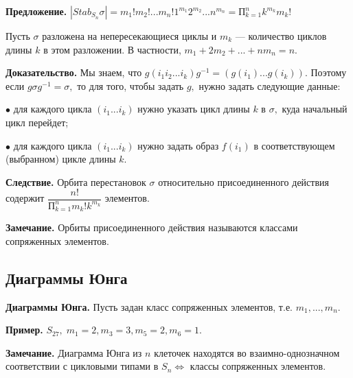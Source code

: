 \documentclass[12pt,a4paper]{article}
\begin{document}
\textbf{Предложение.} $|Stab_{S_{n}}\sigma| = m_{1}!m_{2}!...m_{n}!1^{m_{1}}2^{m_{2}}...n^{m_{n}} = \text{П}_{k = 1}^{n}k^{m_{k}}m_{k}!$ 

Пусть $\sigma$  разложена на непересекающиеся циклы и $m_{k}$ --- количество циклов длины $k$ в этом разложении. В частности, $m_{1} + 2m_{2} + ... + nm_{n} = n.$ 

\textbf{Доказательство.} Мы знаем, что $g(i_{1}i_{2}...i_{k})g^{-1} = (g(i_{1})...g(i_{k})).$ Поэтому если $g \sigma g^{-1} = \sigma,$ то для того, чтобы задать $g,$ нужно задать следующие данные: 

$\bullet$ для каждого цикла $(i_{1}...i_{k})$ нужно указать цикл длины $k$ в $\sigma,$ куда  начальный цикл перейдет; 

$\bullet$ для каждого цикла $(i_{1}...i_{k})$ нужно задать образ $f(i_{1})$ в соответствующем (выбранном) цикле длины $k.$ 

\textbf{Следствие.} Орбита перестановок $\sigma$ относительно присоединенного действия содержит $\dfrac{n!}{\text{П}^{n}_{k = 1} m_{k}!k^{m_{k}}}$ элементов. 

\textbf{Замечание.} Орбиты присоединенного действия называются классами сопряженных элементов. 

\subsection{Диаграммы Юнга}

\textbf{Диаграммы Юнга.} Пусть задан класс сопряженных элементов, т.е. $m_{1}, ..., m_{n}.$ 

\textbf{Пример.} $S_{27}, \; m_{1} = 2, m_{3} = 3, m_{5} = 2, m_{6} = 1.$ 

\textbf{Замечание.} Диаграмма Юнга из $n$ клеточек находятся во взаимно-однозначном соответствии с цикловыми типами в $S_{n} \Leftrightarrow$ классы сопряженных элементов. 
\end{document}
